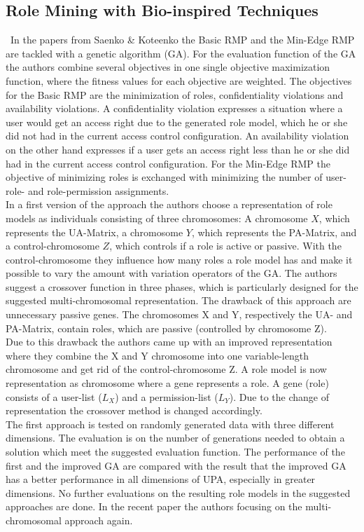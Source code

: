 \subsection{Role Mining with Bio-inspired Techniques}
\label{sec:relatedWork3}\
In the papers from Saenko \& Koteenko \cite{Igor} \cite{saenko2012design} the Basic RMP and the Min-Edge RMP are tackled with a genetic algorithm (GA). For the evaluation function of the GA the authors combine several objectives in one single objective maximization function, where the fitness values for each objective are weighted. The objectives for the Basic RMP are the minimization of roles, confidentiality violations and availability violations. A confidentiality violation expresses a situation where a user would get an access right due to the generated role model, which he or she did not had in the current access control configuration. An availability violation on the other hand expresses if a user gets an access right less than he or she did had in the current access control configuration. For the Min-Edge RMP the objective of minimizing roles is exchanged with minimizing the number of user-role- and role-permission assignments.\\
In a first version of the approach the authors choose a representation of role models as individuals consisting of three chromosomes: A chromosome $X$, which represents the UA-Matrix, a chromosome $Y$, which represents the PA-Matrix, and a control-chromosome $Z$, which controls if a role is active or passive. With the control-chromosome they influence how many roles a role model has and make it possible to vary the amount with variation operators of the GA. The authors suggest a crossover function in three phases, which is particularly designed for the suggested multi-chromosomal representation. The drawback of this approach are unnecessary passive genes. The chromosomes X and Y, respectively the UA- and PA-Matrix, contain roles, which are passive (controlled by chromosome Z).\\
Due to this drawback the authors came up with an improved representation where they combine the X and Y chromosome into one variable-length chromosome and get rid of the control-chromosome Z. A role model is now representation as chromosome where a gene represents a role. A gene (role) consists of a user-list ($L_X$) and a permission-list ($L_Y$). Due to the change of representation the crossover method is changed accordingly.\\
The first approach is tested on randomly generated data with three different dimensions\cite{Igor}. The evaluation is on the number of generations needed to obtain a solution which meet the suggested evaluation function. The performance of the first and the improved GA are compared with the result that the improved GA has a better performance in all dimensions of UPA, especially in greater dimensions\cite{saenko2012design}. No further evaluations on the resulting role models in the suggested approaches are done. In the recent paper \cite{Kotenko:2015} the authors focusing on the multi-chromosomal approach again.\\
